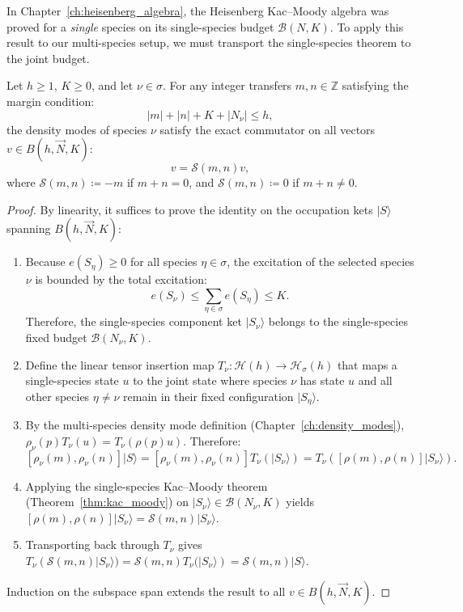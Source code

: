 In Chapter~\ref{ch:heisenberg_algebra}, the Heisenberg Kac--Moody algebra was proved for a \emph{single} species on its single-species budget $\mathcal{B}(N, K)$. To apply this result to our multi-species setup, we must transport the single-species theorem to the joint budget.

\begin{theorem}
\label{thm:app_joint_signed_current_commutator}
Let $h \ge 1$, $K \ge 0$, and let $\nu \in \sigma$. For any integer transfers $m, n \in \mathbb{Z}$ satisfying the margin condition:
\begin{equation}
|m| + |n| + K + |N_\nu| \le h,
\end{equation}
the density modes of species $\nu$ satisfy the exact commutator on all vectors $v \in B(h, \vec{N}, K)$:
\begin{equation}
[\rho_\nu(m), \rho_\nu(n)] v = \mathcal{S}(m, n) v,
\end{equation}
where $\mathcal{S}(m, n) \coloneqq -m$ if $m + n = 0$, and $\mathcal{S}(m, n) \coloneqq 0$ if $m + n \neq 0$.
\end{theorem}

\begin{proof}
By linearity, it suffices to prove the identity on the occupation kets $|S\rangle$ spanning $B(h, \vec{N}, K)$:
\begin{enumerate}
    \item Because $e(S_\eta) \ge 0$ for all species $\eta \in \sigma$, the excitation of the selected species $\nu$ is bounded by the total excitation:
    \[
    e(S_\nu) \le \sum_{\eta \in \sigma} e(S_\eta) \le K.
    \]
    Therefore, the single-species component ket $|S_\nu\rangle$ belongs to the single-species fixed budget $\mathcal{B}(N_\nu, K)$.
    \item Define the linear tensor insertion map $T_\nu : \mathcal{H}(h) \to \mathcal{H}_\sigma(h)$ that maps a single-species state $u$ to the joint state where species $\nu$ has state $u$ and all other species $\eta \neq \nu$ remain in their fixed configuration $|S_\eta\rangle$.
    \item By the multi-species density mode definition (Chapter~\ref{ch:density_modes}), $\rho_\nu(p) T_\nu(u) = T_\nu(\rho(p) u)$. Therefore:
    \[
    [\rho_\nu(m), \rho_\nu(n)] |S\rangle = [\rho_\nu(m), \rho_\nu(n)] T_\nu(|S_\nu\rangle) = T_\nu\left( [\rho(m), \rho(n)] |S_\nu\rangle \right).
    \]
    \item Applying the single-species Kac--Moody theorem (Theorem~\ref{thm:kac_moody}) on $|S_\nu\rangle \in \mathcal{B}(N_\nu, K)$ yields $[\rho(m), \rho(n)] |S_\nu\rangle = \mathcal{S}(m, n) |S_\nu\rangle$.
    \item Transporting back through $T_\nu$ gives $T_\nu(\mathcal{S}(m, n) |S_\nu\rangle) = \mathcal{S}(m, n) T_\nu(|S_\nu\rangle) = \mathcal{S}(m, n) |S\rangle$.
\end{enumerate}
Induction on the subspace span extends the result to all $v \in B(h, \vec{N}, K)$.
\end{proof}

